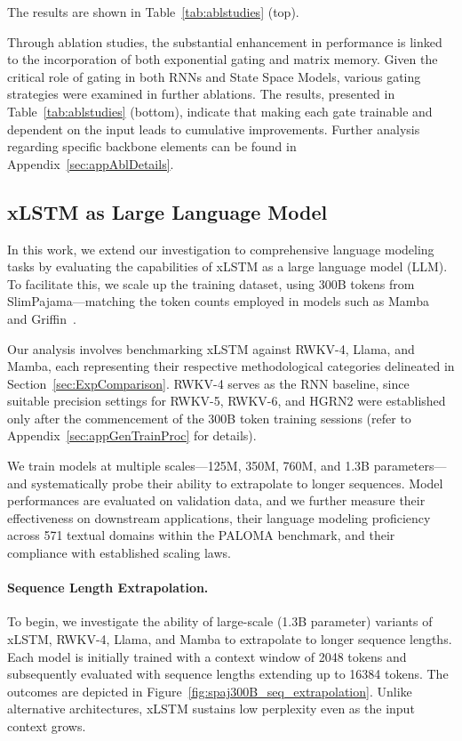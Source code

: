 The results are shown in Table~\ref{tab:ablstudies} (top). 

Through ablation studies, the substantial enhancement in performance is linked to the incorporation of both exponential gating and matrix memory. Given the critical role of gating in both RNNs and State Space Models, various gating strategies were examined in further ablations. The results, presented in Table~\ref{tab:ablstudies} (bottom), indicate that making each gate trainable and dependent on the input leads to cumulative improvements. Further analysis regarding specific backbone elements can be found in Appendix~\ref{sec:appAblDetails}.

\subsection{xLSTM as Large Language Model}
\label{sec:ExpLanguage}

In this work, we extend our investigation to comprehensive language modeling tasks by evaluating the capabilities of xLSTM as a large language model (LLM). To facilitate this, we scale up the training dataset, using 300B tokens from SlimPajama—matching the token counts employed in models such as Mamba~\citep{Gu:24arxiv} and Griffin~\citep{De:24arxiv}.

Our analysis involves benchmarking xLSTM against RWKV-4, Llama, and Mamba, each representing their respective methodological categories delineated in Section~\ref{sec:ExpComparison}. RWKV-4 serves as the RNN baseline, since suitable precision settings for RWKV-5, RWKV-6, and HGRN2 were established only after the commencement of the 300B token training sessions (refer to Appendix~\ref{sec:appGenTrainProc} for details).

We train models at multiple scales—125M, 350M, 760M, and 1.3B parameters—and systematically probe their ability to extrapolate to longer sequences. Model performances are evaluated on validation data, and we further measure their effectiveness on downstream applications, their language modeling proficiency across 571 textual domains within the PALOMA benchmark, and their compliance with established scaling laws.

\paragraph{Sequence Length Extrapolation.}
\label{sec:spaj300B_ctx_extrapolation}
To begin, we investigate the ability of large-scale (1.3B parameter) variants of xLSTM, RWKV-4, Llama, and Mamba to extrapolate to longer sequence lengths. Each model is initially trained with a context window of 2048 tokens and subsequently evaluated with sequence lengths extending up to 16384 tokens. The outcomes are depicted in Figure~\ref{fig:spaj300B_seq_extrapolation}. Unlike alternative architectures, xLSTM sustains low perplexity even as the input context grows.

